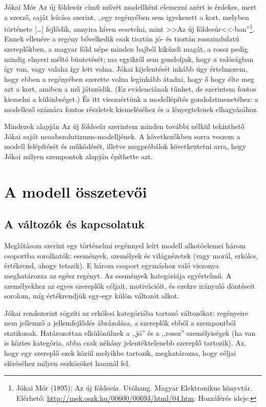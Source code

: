 \documentclass{thesis-ekf}
\begin{document}
    Jókai Mór Az új földesúr című művét modellként elemezni azért is érdekes, mert a szerző, saját leírása szerint,
        ,,egy regényében sem igyekezett a kort, melyben története [\dots] fejlődik, annyira híven ecsetelni,
        mint >>Az új földesúr<<-ban''\footnote{Jókai Mór (1895): Az új földesúr. Utóhang. Magyar Elektronikus könyvtár.
            Elérhető: \url{http://mek.oszk.hu/00600/00693/html/04.htm}.
            Hozzáférés ideje: }.
    Ennek ellenére a regény bővelkedik csak tisztán jó- és tisztán rosszindulatú szereplőkben, a magyar föld népe
        minden bajból kiküzdi magát, a rossz pedig mindig elnyeri méltó büntetését;
        ma egyikről sem gondoljuk, hogy a valóságban így van, vagy valaha így lett volna.
    Jókai kijelentését inkább úgy értelmezem, hogy ebben a regényében szerette volna leginkább átadni,
        hogy ő hogy élte meg azt a kort, amiben a mű játszódik.
    (Ez evidenciának tűnhet, de szerintem fontos kiemelni a különbséget.)
    És itt visszaértünk a modellépítés gondolatmenetéhez: a modellező számára fontos részletek kiemeléséhez
        és a lényegtelenek elhagyásához.

    Mindezek alapján Az új földesúr szerintem minden további nélkül tekinthető Jókai saját neoabszolutizmus-modelljének.
    A következőkben sorra veszem a modell felépítését és működését, illetve megpróbálok következtetni arra,
        hogy Jókai milyen szempontok alapján építhette azt.


    \chapter{A modell összetevői}\label{ch:a-modell-osszetevoi}

    \section{A változók és kapcsolatuk}\label{sec:a-valtozok-es-kapcsolatuk}

    Meglátásom szerint egy történelmi regénnyel leírt modell alkotóelemei három csoportba sorolhatók:
        események, személyek és világnézetek (vagy morál, erkölcs, értékrend, ahogy tetszik).
    E három csoport egymáshoz való viszonya meghatározza az egész regényt.
    Az események kategóriája egyértelmű.
    A személyekhez az egyes szereplők céljait, motivációit, és ezekre irányuló döntéseit sorolom,
        míg értékrendjük egy-egy külön változót alkot.

    Jókai rendszerint rögzíti az erkölcsi kategóriába tartozó változókat:
        regényeire nem jellemző a jellemfejlődés ábrázolása, a szereplők ebből a szempontból statikusak.
    Határozottan elkülönülnek a ,,jó'' és a ,,rossz'' személyiségek (ha van is köztes kategória, abba csak néhány
        jelentéktelenebb szereplő tartozik).
    Az, hogy egy szereplő ezek közül melyikbe tartozik, meghatározza, hogy céljai eléréséhez milyen eszközöket használ fel.
\end{document}
